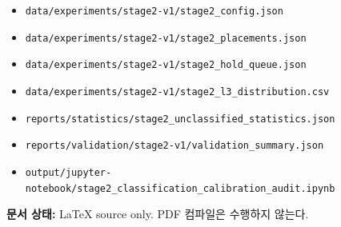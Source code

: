 \documentclass[11pt,a4paper]{article}
\begin{document}
\begin{itemize}[leftmargin=2em]
  \item \nolinkurl{data/experiments/stage2-v1/stage2_config.json}
  \item \nolinkurl{data/experiments/stage2-v1/stage2_placements.json}
  \item \nolinkurl{data/experiments/stage2-v1/stage2_hold_queue.json}
  \item \nolinkurl{data/experiments/stage2-v1/stage2_l3_distribution.csv}
  \item \nolinkurl{reports/statistics/stage2_unclassified_statistics.json}
  \item \nolinkurl{reports/validation/stage2-v1/validation_summary.json}
  \item \nolinkurl{output/jupyter-notebook/stage2_classification_calibration_audit.ipynb}
\end{itemize}

\vfill
\noindent\textbf{문서 상태:} LaTeX source only. PDF 컴파일은 수행하지 않는다.
\end{document}
